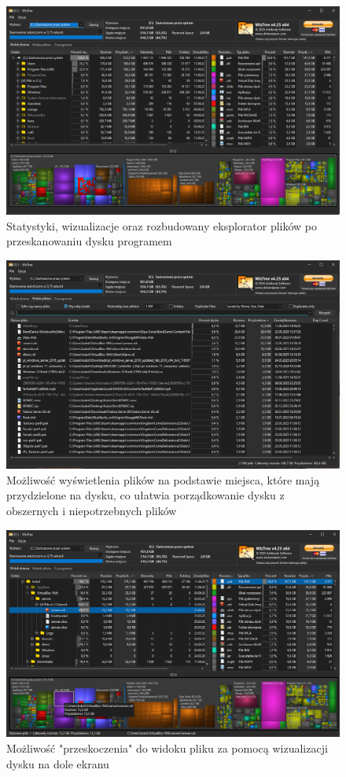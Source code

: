 \documentclass[0.82pt,a4paper]{article}
\begin{document}
    \begin{figure}[H]
        \centering
        \includegraphics[width=0.8\linewidth]{media/WizTree/wiz2.PNG}
        \caption[wiz przeskanowane]{Statystyki, wizualizacje oraz rozbudowany eksplorator plików po przeskanowaniu dysku programem}
        \label{fig:wiz_skan}
    \end{figure}

    \begin{figure}[H]
        \centering
        \includegraphics[width=0.8\linewidth]{media/WizTree/wiz3.PNG}
        \caption[wiz sciezki]{Możliwość wyświetlenia plików na podstawie miejsca, które mają przydzielone na dysku, co ułatwia porządkowanie dysku z obszernych i niepotrzebnych plików}
        \label{fig:wiz_sciezki}
    \end{figure}
    
    \begin{figure}[H]
        \centering
        \includegraphics[width=0.8\linewidth]{media/WizTree/wiz4.png}
        \caption[wiz wyszukiwanie kliknieciem]{Możliwość "przeskoczenia" do widoku pliku za pomocą wizualizacji dysku na dole ekranu}
        \label{fig:wiz_klik}
    \end{figure}
\end{document}

